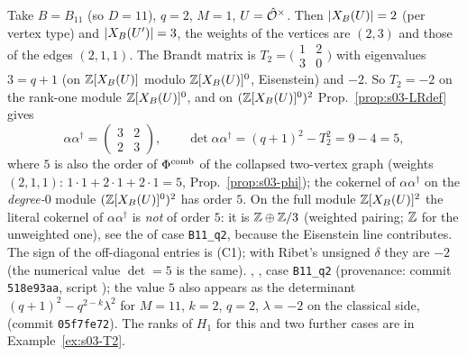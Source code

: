 \begin{example}[the definite level-raising matrix for $B_{11}$, $q=2$]\label{ex:s03-LRB11}
Take $B=B_{11}$ (so $D=11$), $q=2$, $M=1$, $U=\hat{\mathcal{O}}^\times$. Then $|X_B(U)|=2$ (per vertex type) and $|X_B(U')|=3$, the weights of the vertices are $(2,3)$ and those of the
edges $(2,1,1)$. The Brandt matrix is $T_2=\big(\begin{smallmatrix}1&2\\3&0\end{smallmatrix}\big)$ with eigenvalues $3=q+1$ (on $\mathbb{Z}[X_B(U)]$ modulo $\mathbb{Z}[X_B(U)]^0$, Eisenstein) and $-2$.
So $T_2=-2$ on the rank-one module $\mathbb{Z}[X_B(U)]^0$, and on $(\mathbb{Z}[X_B(U)]^0)^2$ Prop.~\ref{prop:s03-LRdef} gives
\[\alpha\alpha^\dagger=\begin{pmatrix}3&2\\2&3\end{pmatrix},\qquad\det\alpha\alpha^\dagger=(q+1)^2-T_2^2=9-4=5,\]
where $5$ is also the order of $\Phi^{\mathrm{comb}}$ of the collapsed two-vertex graph (weights $(2,1,1)$: $1\cdot1+2\cdot1+2\cdot1=5$, Prop.~\ref{prop:s03-phi}); the cokernel of
$\alpha\alpha^\dagger$ on the \emph{degree-$0$} module $(\mathbb{Z}[X_B(U)]^0)^2$ has order $5$. On the full module $\mathbb{Z}[X_B(U)]^2$ the literal cokernel of $\alpha\alpha^\dagger$ is \emph{not} of order $5$:
it is $\mathbb{Z}\oplus\mathbb{Z}/3$ (weighted pairing; $\mathbb{Z}$ for the unweighted one), see the  of case \texttt{B11\_q2}, because the Eisenstein line contributes. The sign of the
off-diagonal entries is (C1); with Ribet's unsigned $\delta$ they are $-2$ (the numerical value $\det=5$ is the same). \stcomp{}, , case \texttt{B11\_q2}
(provenance: commit \texttt{518e93aa}, script ); the value $5$ also appears as the determinant $(q+1)^2-q^{2-k}\lambda^2$ for $M=11$, $k=2$, $q=2$, $\lambda=-2$
on the classical side,  (commit \texttt{05f7fe72}). The ranks of $H_1$ for this and two further cases are in Example~\ref{ex:s03-T2}.
\end{example}

